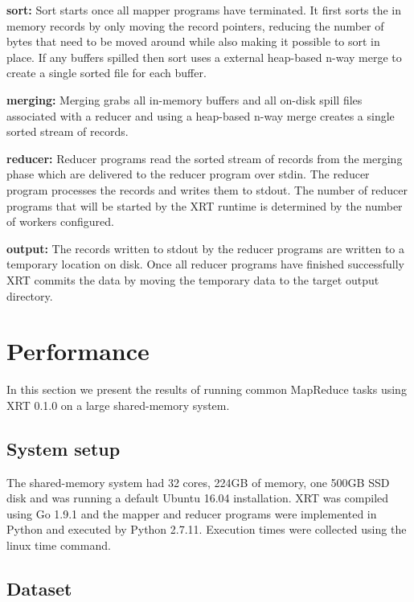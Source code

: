 \documentclass[twocolumn,11px]{article}       %
\begin{document}
\bigskip
\noindent
\textbf{sort:} Sort starts once all mapper programs have terminated.
It first sorts the in memory records by only moving the record pointers, reducing the number of bytes that need to be moved around while also making it possible to sort in place.
If any buffers spilled then sort uses a external heap-based n-way merge to create a single sorted file for each buffer.

\bigskip
\noindent
\textbf{merging:} Merging grabs all in-memory buffers and all on-disk spill files associated with a reducer and using a heap-based n-way merge creates a single sorted stream of records.

\bigskip
\noindent
\textbf{reducer:} Reducer programs read the sorted stream of records from the merging phase which are delivered to the reducer program over stdin.
The reducer program processes the records and writes them to stdout.
The number of reducer programs that will be started by the XRT runtime is determined by the number of workers configured.

\bigskip
\noindent
\textbf{output:} The records written to stdout by the reducer programs are written to a temporary location on disk.
Once all reducer programs have finished successfully XRT commits the data by moving the temporary data to the target output directory.

\section{Performance} \label{sec:perf}

In this section we present the results of running common MapReduce tasks using XRT 0.1.0 on a large shared-memory system.

\subsection{System setup}

The shared-memory system had 32 cores, 224GB of memory, one 500GB SSD disk and was running a default Ubuntu 16.04 installation.
XRT was compiled using Go 1.9.1 and the mapper and reducer programs were implemented in Python and executed by Python 2.7.11.
Execution times were collected using the linux time command.

\subsection{Dataset}
\end{document}
